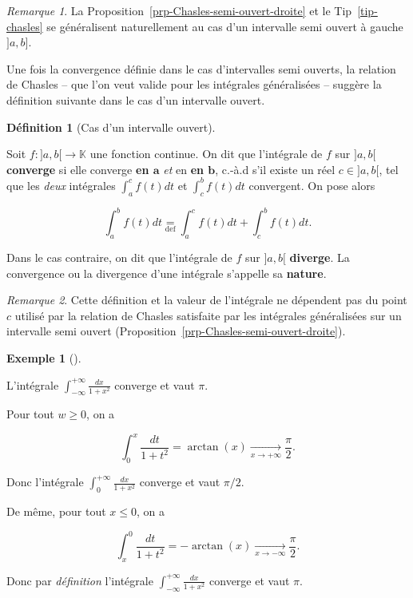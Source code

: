 \documentclass[
  french,
  letterpaper,
  DIV=11,
  numbers=noendperiod]{scrreprt}
\theoremstyle{plain}
\theoremstyle{definition}
\newtheorem{definition}{Définition}[chapter]
\theoremstyle{plain}
\theoremstyle{plain}
\theoremstyle{definition}
\theoremstyle{definition}
\newtheorem{example}{Exemple}[chapter]
\theoremstyle{plain}
\theoremstyle{remark}
\newtheorem{refremark}{Remarque}[chapter]
\begin{document}
\begin{refremark}
La Proposition~\ref{prp-Chasles-semi-ouvert-droite} et le
Tip~\ref{tip-chasles} se généralisent naturellement au cas d'un
intervalle semi ouvert à gauche \(]a,b]\).

\label{rem-version-semi-ouvert-gauche}

\end{refremark}

Une fois la convergence définie dans le cas d'intervalles semi ouverts,
la relation de Chasles -- que l'on veut valide pour les intégrales
généralisées -- suggère la définition suivante dans le cas d'un
intervalle ouvert.

\begin{definition}[Cas d'un intervalle
ouvert]\protect\hypertarget{def-cv-intervalle-ouvert}{}\label{def-cv-intervalle-ouvert}

Soit \(f:]a,b[ \to \mathbb{K}\) une fonction continue. On dit que
l'intégrale de \(f\) sur \(]a,b[\) \textbf{converge} si elle converge
\textbf{en \(\boldsymbol{a}\)} \emph{et} en \textbf{en
\(\boldsymbol{b}\)}, c.-à.d s'il existe un réel \(c \in ]a,b[\), tel que
les \emph{deux} intégrales \(\int_{a}^{c}f(t)dt\) et
\(\int_{c}^{b}f(t)dt\) convergent. On pose alors

\[
\int_{a}^{b}f(t)dt \underset{\mathrm{def}}{=}
\int_{a}^{c}f(t)dt + \int_{c}^{b}f(t)dt. 
\]

Dans le cas contraire, on dit que l'intégrale de \(f\) sur \(]a,b[\)
\textbf{diverge}. La convergence ou la divergence d'une intégrale
s'appelle sa \textbf{nature}.

\end{definition}

\begin{refremark}
Cette définition et la valeur de l'intégrale ne dépendent pas du point
\(c\) utilisé par la relation de Chasles satisfaite par les intégrales
généralisées sur un intervalle semi ouvert
(Proposition~\ref{prp-Chasles-semi-ouvert-droite}).

\label{rem-chasles}

\end{refremark}

\begin{example}[]\protect\hypertarget{exm-ouvert-convergente}{}\label{exm-ouvert-convergente}

L'intégrale \(\int_{-\infty}^{+\infty}\frac{dx}{1+x^{2}}\) converge et
vaut \(\pi\).

Pour tout \(w \geqslant 0\), on a

\[
    \int_{0}^{x}\frac{dt}{1+t^{2}}= \arctan(x) \underset{x \to+\infty}{\longrightarrow} \frac{\pi}{2}.
\]

Donc l'intégrale \(\int_{0}^{+\infty}\frac{dx}{1+x^{2}}\) converge et
vaut \(\pi/2\).

De même, pour tout \(x \leqslant 0\), on a

\[
    \int_{x}^{0}\frac{dt}{1+t^{2}} = - \arctan(x) \underset{x \to -\infty}{\longrightarrow} \frac{\pi}{2}.
\]

Donc par \emph{définition} l'intégrale
\(\int_{-\infty}^{+\infty}\frac{dx}{1+x^{2}}\) converge et vaut \(\pi\).

\end{example}
\end{document}
